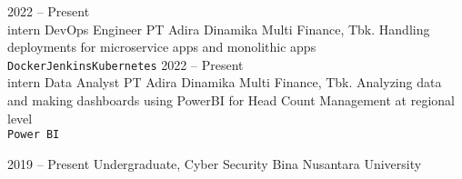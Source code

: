 \documentclass[9pt]{developercv} %
\begin{document}
\begin{entrylist}
	\entry
		{2022 -- Present\\\footnotesize{intern}}
		{DevOps Engineer}
		{PT Adira Dinamika Multi Finance, Tbk.}
		{Handling deployments for microservice apps and monolithic apps\\ \texttt{Docker}\slashsep\texttt{Jenkins}\slashsep\texttt{Kubernetes}}
	\entry
		{2022 -- Present\\\footnotesize{intern}}
		{Data Analyst}
		{PT Adira Dinamika Multi Finance, Tbk.}
		{Analyzing data and making dashboards using PowerBI for Head Count Management at regional level\\ \texttt{Power BI}}
\end{entrylist}



\begin{entrylist}
	\entry
		{2019 -- Present}
		{Undergraduate, Cyber Security}
		{Bina Nusantara University}
		{}
\end{entrylist}

\end{document}
